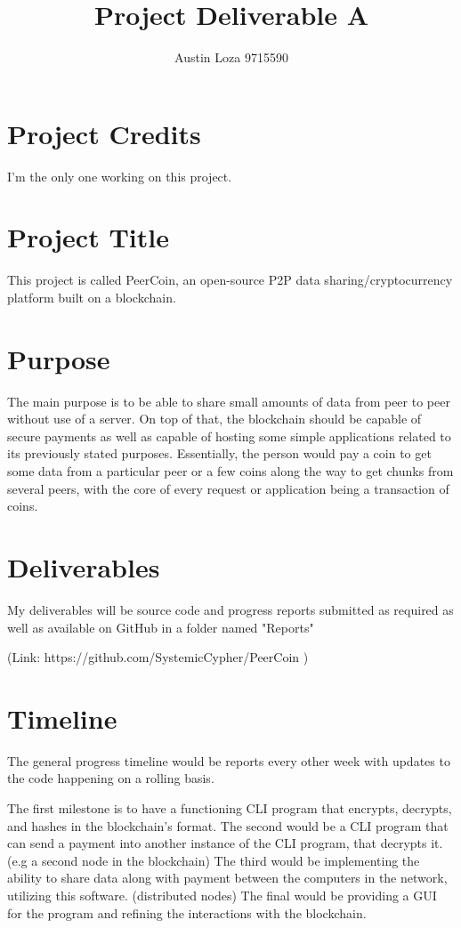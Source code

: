 \documentclass [12pt] {article}
\begin{document}
\author{Austin Loza 9715590}
\title{Project Deliverable A}
\maketitle
\section*{Project Credits}
I'm the only one working on this project.
\section*{Project Title}
This project is called PeerCoin, an open-source P2P data sharing/cryptocurrency platform built on a blockchain. 
\section*{Purpose}
The main purpose is to be able to share small amounts of data from peer to peer without use of a server. On top of that, the blockchain should be capable of secure payments as well as capable of hosting some simple applications related to its previously stated purposes. Essentially, the person would pay a coin to get some data from a particular peer or a few coins along the way to get chunks from several peers, with the core of every request or application being a transaction of coins.
\section*{Deliverables}
My deliverables will be source code and progress reports submitted as required as well as available on GitHub in a folder named "Reports" 

(Link: https://github.com/SystemicCypher/PeerCoin )
\section*{Timeline}
The general progress timeline would be reports every other week with updates to the code happening on a rolling basis.

The first milestone is to have a functioning CLI program that encrypts, decrypts, and hashes in the blockchain's format.
The second would be a CLI program that can send a payment into another instance of the CLI program, that decrypts it. (e.g a second node in the blockchain)
The third would be implementing the ability to share data along with payment between the computers in the network, utilizing this software. (distributed nodes)
The final would be providing a GUI for the program and refining the interactions with the blockchain.
\end{document}
